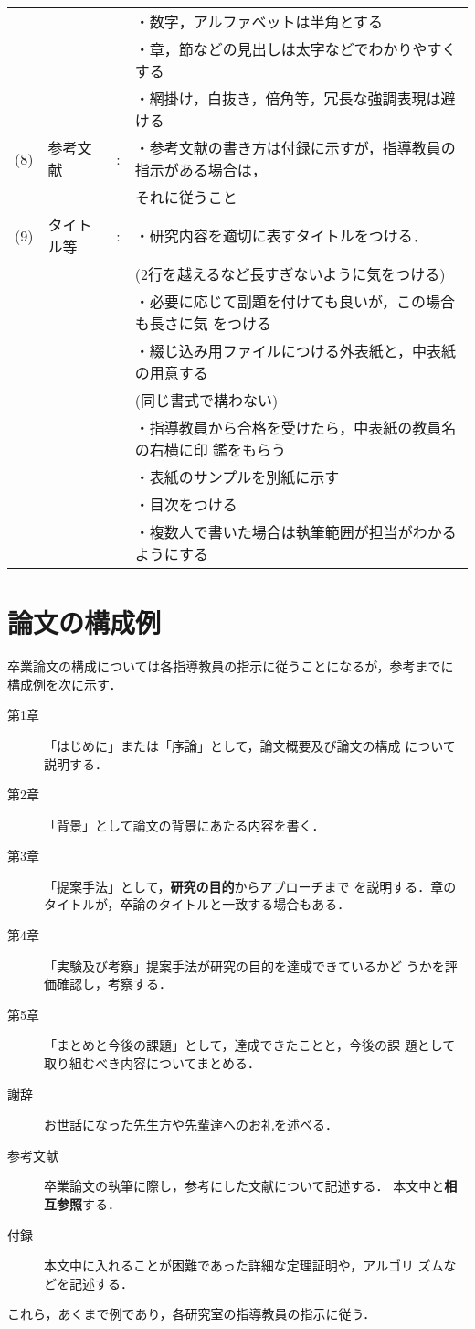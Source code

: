 \begin{tabular}{llcl}
          & & &・数字，アルファベットは半角とする\\
          & & &・章，節などの見出しは太字などでわかりやすくする\\
          & & &・網掛け，白抜き，倍角等，冗長な強調表現は避ける\\
    (8)&参考文献&:&・参考文献の書き方は付録に示すが，指導教員の
          指示がある場合は，\\
          & & &\hspace*{1zw}それに従うこと\\
    (9)&タイトル等&:&・研究内容を適切に表すタイトルをつける．\\
          & & &\hspace*{1zw}(2行を越えるなど長すぎないように気をつける)\\
          & & &・必要に応じて副題を付けても良いが，この場合も長さに気
                 をつける\\
          & & &・綴じ込み用ファイルにつける外表紙と，中表紙の用意する\\
          & & &\hspace*{1zw}(同じ書式で構わない)\\
          & & &・指導教員から合格を受けたら，中表紙の教員名の右横に印
                 鑑をもらう\\
          & & &・表紙のサンプルを別紙に示す\\
          & & &・目次をつける\\
          & & &・複数人で書いた場合は執筆範囲が担当がわかるようにする\\
  \end{tabular}

\section{論文の構成例}

卒業論文の構成については各指導教員の指示に従うことになるが，参考までに
構成例を次に示す．

\begin{description}
\item[第1章] 「はじめに」または「序論」として，論文概要及び論文の構成
  について説明する．
\item[第2章] 「背景」として論文の背景にあたる内容を書く．
\item[第3章] 「提案手法」として，\textbf{研究の目的}からアプローチまで
  を説明する．章のタイトルが，卒論のタイトルと一致する場合もある．
\item[第4章] 「実験及び考察」提案手法が研究の目的を達成できているかど
  うかを評価確認し，考察する．
\item[第5章] 「まとめと今後の課題」として，達成できたことと，今後の課
  題として取り組むべき内容についてまとめる．
\item[謝辞] お世話になった先生方や先輩達へのお礼を述べる．
\item[参考文献] 卒業論文の執筆に際し，参考にした文献について記述する．
  本文中と\textbf{相互参照}する．
\item[付録] 本文中に入れることが困難であった詳細な定理証明や，アルゴリ
  ズムなどを記述する．
\end{description}
これら，あくまで例であり，各研究室の指導教員の指示に従う．

